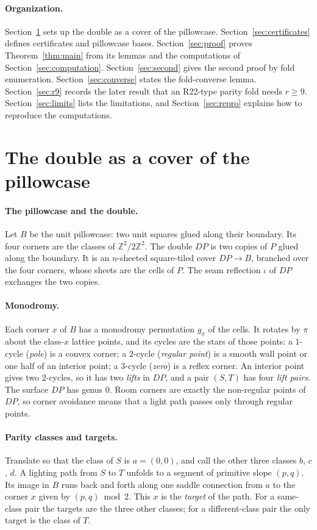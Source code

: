 \documentclass[11pt]{article}
\theoremstyle{definition}
\theoremstyle{remark}
\newcommand{\Z}{\mathbb Z}
\begin{document}
\paragraph{Organization.}
Section~\ref{sec:double} sets up the double as a cover of the pillowcase.
Section~\ref{sec:certificates} defines certificates and pillowcase bases.
Section~\ref{sec:proof} proves Theorem~\ref{thm:main} from its lemmas and the
computations of Section~\ref{sec:computation}. Section~\ref{sec:second} gives
the second proof by fold enumeration. Section~\ref{sec:converse} states the
fold-converse lemma. Section~\ref{sec:r9} records the later result that an
R22-type parity fold needs $r\ge 9$. Section~\ref{sec:limits} lists the
limitations, and Section~\ref{sec:repro} explains how to reproduce the
computations.

\section{The double as a cover of the pillowcase}\label{sec:double}

\paragraph{The pillowcase and the double.}
Let $B$ be the unit pillowcase: two unit squares glued along their boundary.
Its four corners are the classes of $\Z^2/2\Z^2$. The double $DP$ is two
copies of $P$ glued along the boundary. It is an $n$-sheeted square-tiled
cover $DP\to B$, branched over the four corners, whose sheets are the cells of
$P$. The seam reflection $\iota$ of $DP$ exchanges the two copies.

\paragraph{Monodromy.}
Each corner $x$ of $B$ has a monodromy permutation $g_x$ of the cells. It
rotates by $\pi$ about the class-$x$ lattice points, and its cycles are the
stars of those points:
a $1$-cycle (\emph{pole}) is a convex corner;
a $2$-cycle (\emph{regular point}) is a smooth wall point or one half of an
interior point;
a $3$-cycle (\emph{zero}) is a reflex corner.
An interior point gives two $2$-cycles, so it has two \emph{lifts} in $DP$, and
a pair $(S,T)$ has four \emph{lift pairs}. The surface $DP$ has genus $0$. Room
corners are exactly the non-regular points of $DP$, so corner avoidance means
that a light path passes only through regular points.

\paragraph{Parity classes and targets.}
Translate so that the class of $S$ is $a=(0,0)$, and call the other three
classes $b$, $c$, $d$. A lighting path from $S$ to $T$ unfolds to a segment of
primitive slope $(p,q)$. Its image in $B$ runs back and forth along one saddle
connection from $a$ to the corner $x$ given by $(p,q)\bmod 2$. This $x$ is the
\emph{target} of the path. For a same-class pair the targets are the three
other classes; for a different-class pair the only target is the class of $T$.
\end{document}
